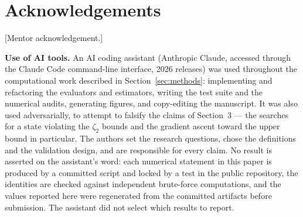 \hypertarget{acknowledgements}{%
\section*{Acknowledgements}\label{acknowledgements}}

[Mentor acknowledgement.]

\textbf{Use of AI tools.} An AI coding assistant (Anthropic Claude, accessed through the Claude
Code command-line interface, 2026 releases) was used throughout the computational work described
in Section~\ref{sec:methods}: implementing and refactoring the evaluators and estimators, writing
the test suite and the numerical audits, generating figures, and copy-editing the manuscript. It
was also used adversarially, to attempt to falsify the claims of Section~3 --- the searches for a
state violating the \(\zeta_2\) bounds and the gradient ascent toward the upper bound in
particular. The authors set the research questions, chose the definitions and the validation
design, and are responsible for every claim. No result is asserted on the assistant's word: each
numerical statement in this paper is produced by a committed script and locked by a test in the
public repository, the identities are checked against independent brute-force computations, and
the values reported here were regenerated from the committed artifacts before submission. The
assistant did not select which results to report.
